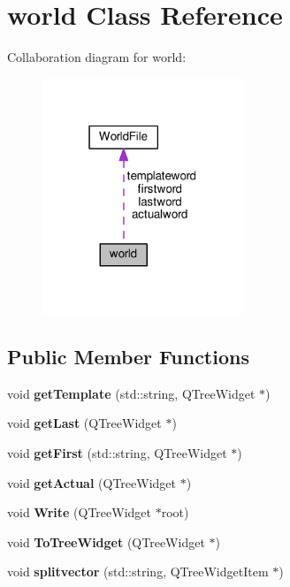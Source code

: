 \section{world Class Reference}
\label{classworld}


Collaboration diagram for world\+:\nopagebreak
\begin{figure}[H]
\begin{center}
\leavevmode
\includegraphics[width=171pt]{classworld__coll__graph}
\end{center}
\end{figure}
\subsection*{Public Member Functions}
\begin{DoxyCompactItemize}
\item 
void {\bfseries get\+Template} (std\+::string, Q\+Tree\+Widget $\ast$)\label{classworld_a9ed6880743440c830472270d46809e8d}

\item 
void {\bfseries get\+Last} (Q\+Tree\+Widget $\ast$)\label{classworld_ae76b4a459b6cee56d379299d752202b9}

\item 
void {\bfseries get\+First} (std\+::string, Q\+Tree\+Widget $\ast$)\label{classworld_a2bfb14d1aa48ac5270b19a040391f4ea}

\item 
void {\bfseries get\+Actual} (Q\+Tree\+Widget $\ast$)\label{classworld_aad2c248d44ee8bda80455a8a5428ab64}

\item 
void {\bfseries Write} (Q\+Tree\+Widget $\ast$root)\label{classworld_a96df0ad616b032bf0596d66632dc99fb}

\item 
void {\bfseries To\+Tree\+Widget} (Q\+Tree\+Widget $\ast$)\label{classworld_a04347114d1c3c636a0508e55d23f7ff2}

\item 
void {\bfseries splitvector} (std\+::string, Q\+Tree\+Widget\+Item $\ast$)\label{classworld_ad7877f7325e8cd2312786a992786f8d5}

\end{DoxyCompactItemize}

